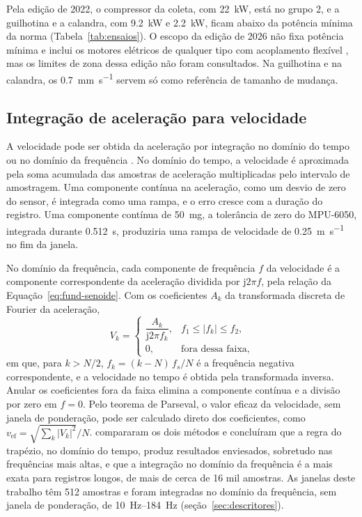 Pela edição de 2022, o compressor da coleta, com \SI{22}{\kilo\watt}, está no grupo 2, e a guilhotina e a calandra, com \SI{9,2}{\kilo\watt} e \SI{2,2}{\kilo\watt}, ficam abaixo da potência mínima da norma (Tabela~\ref{tab:ensaios}). O escopo da edição de 2026 não fixa potência mínima e inclui os motores elétricos de qualquer tipo com acoplamento flexível \cite{iso208163_2026}, mas os limites de zona dessa edição não foram consultados. Na guilhotina e na calandra, os \SI{0,7}{\milli\meter\per\second} servem só como referência de tamanho de mudança.

\subsection{Integração de aceleração para velocidade}\label{sec:fund-integracao}

A velocidade pode ser obtida da aceleração por integração no domínio do tempo ou no domínio da frequência \cite{brandt2014}. No domínio do tempo, a velocidade é aproximada pela soma acumulada das amostras de aceleração multiplicadas pelo intervalo de amostragem. Uma componente contínua na aceleração, como um desvio de zero do sensor, é integrada como uma rampa, e o erro cresce com a duração do registro. Uma componente contínua de \SI{50}{mg}, a tolerância de zero do MPU-6050, integrada durante \SI{0,512}{\second}, produziria uma rampa de velocidade de \SI{0,25}{\meter\per\second} no fim da janela.

No domínio da frequência, cada componente de frequência $f$ da velocidade é a componente correspondente da aceleração dividida por $\mathrm{j}2\pi f$, pela relação da Equação~\eqref{eq:fund-senoide}. Com os coeficientes $A_k$ da transformada discreta de Fourier da aceleração,
\begin{equation}
V_k =
\begin{cases}
\dfrac{A_k}{\mathrm{j}2\pi f_k}, & f_1 \le |f_k| \le f_2,\\[2ex]
0, & \text{fora dessa faixa},
\end{cases}
\label{eq:fund-integracao}
\end{equation}
em que, para $k > N/2$, $f_k = (k - N)\,f_s/N$ é a frequência negativa correspondente, e a velocidade no tempo é obtida pela transformada inversa. Anular os coeficientes fora da faixa elimina a componente contínua e a divisão por zero em $f = 0$. Pelo teorema de Parseval, o valor eficaz da velocidade, sem janela de ponderação, pode ser calculado direto dos coeficientes, como $v_{\mathrm{ef}} = \sqrt{\textstyle\sum_k |V_k|^2}/N$.  compararam os dois métodos e concluíram que a regra do trapézio, no domínio do tempo, produz resultados enviesados, sobretudo nas frequências mais altas, e que a integração no domínio da frequência é a mais exata para registros longos, de mais de cerca de 16 mil amostras. As janelas deste trabalho têm \num{512} amostras e foram integradas no domínio da frequência, sem janela de ponderação, de \SIrange{10}{184}{\hertz} (seção~\ref{sec:descritores}).

